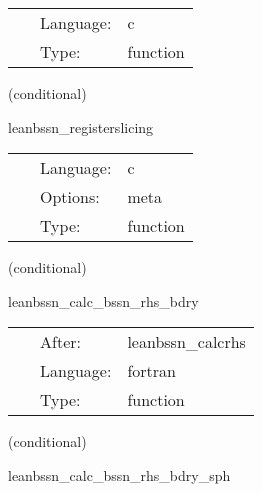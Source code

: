  \begin{tabular*}{160mm}{cll} 
~ & Language:  & c \\ 
~ & Type:  & function \\ 
\end{tabular*} 


\vspace{5mm}

   (conditional) 

\hspace{5mm} leanbssn\_registerslicing 

\hspace{5mm}{\it register slicing } 


\hspace{5mm}

 \begin{tabular*}{160mm}{cll} 
~ & Language:  & c \\ 
~ & Options:  & meta \\ 
~ & Type:  & function \\ 
\end{tabular*} 


\vspace{5mm}

   (conditional) 

\hspace{5mm} leanbssn\_calc\_bssn\_rhs\_bdry 

\hspace{5mm}{\it mol boundary rhs calculation } 


\hspace{5mm}

 \begin{tabular*}{160mm}{cll} 
~ & After:  & leanbssn\_calcrhs \\ 
~ & Language:  & fortran \\ 
~ & Type:  & function \\ 
\end{tabular*} 


\vspace{5mm}

   (conditional) 

\hspace{5mm} leanbssn\_calc\_bssn\_rhs\_bdry\_sph 

\hspace{5mm}{\it mol boundary rhs calculation in spherical coordinates } 


\hspace{5mm}

